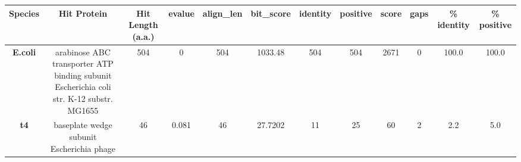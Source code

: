\begin{tabular}{|c|c|c|c|c|c|c|c|c|c|c|c|} \hline
\textbf{Species} & \textbf{Hit Protein} & \textbf{Hit Length (a.a.)} & \textbf{evalue} & \textbf{align\_len} & \textbf{bit\_score} & \textbf{identity} & \textbf{positive} & \textbf{score} & \textbf{gaps} & \textbf{\% identity} & \textbf{\% positive} \\ \hline
\textbf{E.coli} & arabinose ABC transporter ATP binding subunit Escherichia coli str. K-12 substr. MG1655 & 504 & 0 & 504 & 1033.48 & 504 & 504 & 2671 & 0 & 100.0 & 100.0\\
\textbf{t4} & baseplate wedge subunit Escherichia phage  & 46 & 0.081 & 46 & 27.7202 & 11 & 25 & 60 & 2 & 2.2 & 5.0\\
\hline \end{tabular}
